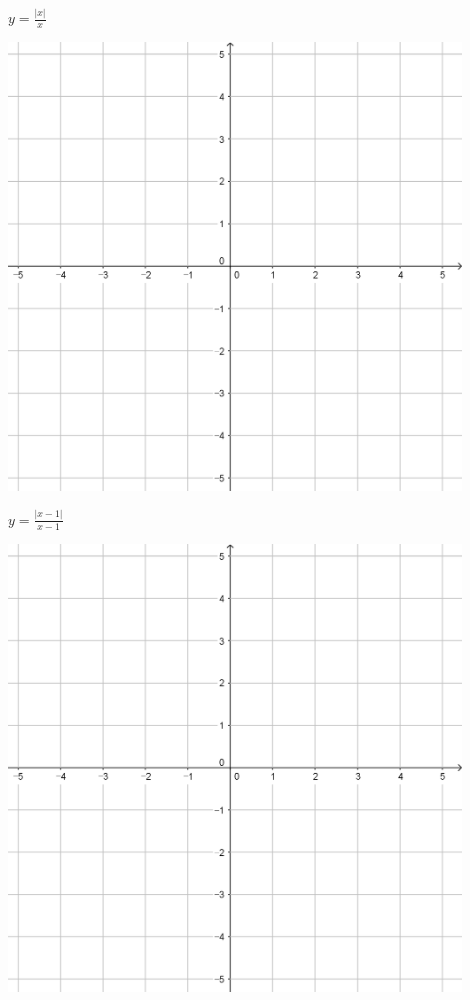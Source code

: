 \documentclass[a4paper]{oblivoir}
\begin{document}
\clearpage
\begin{minipage}{0.45\textwidth}\centering
\(y=\frac{|x|}{x}\)
\par\bigskip\includegraphics[width=0.9\textwidth]{55}
\end{minipage}
\begin{minipage}{0.45\textwidth}\centering
\(y=\frac{|x-1|}{x-1}\)
\par\bigskip\includegraphics[width=0.9\textwidth]{55}
\end{minipage}\bigskip\bigskip\par
\end{document}
